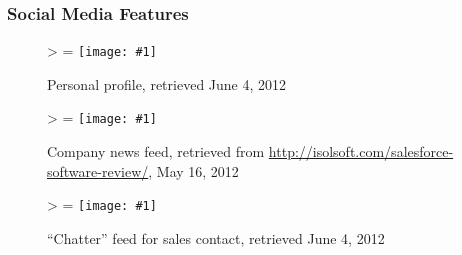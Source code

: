 \documentclass[12pt,letterpaper]{article}
\newlength{\imgwidth}
\newlength{\imgheight}
\newlength{\finalwidth}
\newlength{\finalheight}
\newlength{\imgtextheight}
\newcommand\scalegraphics[1]{%
	\settowidth{\imgwidth}{\texttt{[image: \#1]}}%
	\settoheight{\imgheight}{\texttt{[image: \#1]}}%
	\ifnum\imgwidth>\imgheight \def\imgangle{90} \else \def\imgangle{0} \fi%
	\setlength{\imgtextheight}{0.74\textheight}%
	\setlength{\finalwidth}{\minof{\imgwidth}{\textwidth}}%
	\setlength{\finalheight}{\minof{\imgheight}{\imgtextheight}}%
	\ifnum\finalwidth=\imgwidth \def\imgangle{0} \fi%
	\texttt{[image: \#1]}%
}
\newcommand{\downloadDate}{May 16, 2012}
\begin{document}
\newpage
\FloatBarrier
\subsubsection{Social Media Features}
\begin{figure}[htbp]
	\centering
	\scalegraphics{./img/force/frce_profile}
	\caption[salesforce.com: Personal profile]{Personal profile, retrieved June 4, 2012}
\end{figure}

\begin{figure}[htbp]
	\centering
	\scalegraphics{./img/force/frce_company_feed}
	\caption[salesforce.com: Company news feed]{Company news feed, retrieved from \url{http://isolsoft.com/salesforce-software-review/}, \downloadDate}
\end{figure}

\begin{figure}[htbp]
	\centering
	\scalegraphics{./img/force/frce_contact_chatter}
	\caption[salesforce.com: ``Chatter'' feed for sales contact]{``Chatter'' feed for sales contact, retrieved June 4, 2012}
\end{figure}
\end{document}
